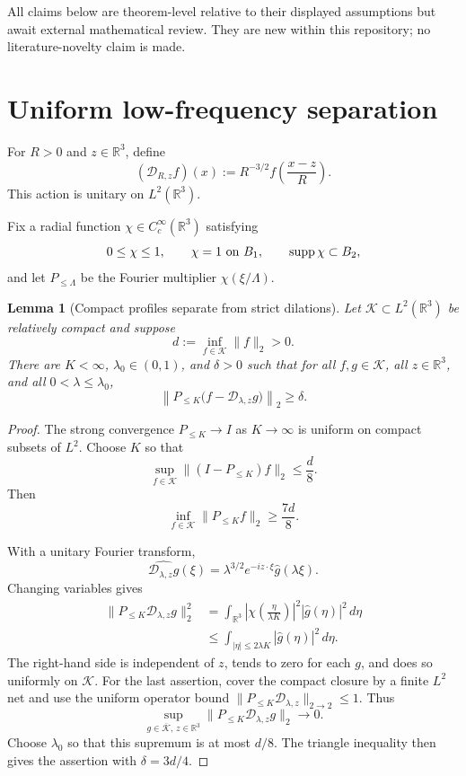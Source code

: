 \documentclass[11pt]{article}
\newtheorem{lemma}[theorem]{Lemma}
\theoremstyle{remark}
\newcommand{\R}{\mathbb R}
\newcommand{\D}{\mathcal D}
\newcommand{\Plo}[1]{P_{\le #1}}
\begin{document}
All claims below are theorem-level relative to their displayed assumptions
but await external mathematical review.  They are new within this
repository; no literature-novelty claim is made.

\section{Uniform low-frequency separation}

For \(R>0\) and \(z\in\R^3\), define
\[
 (\D_{R,z}f)(x)
 :=
 R^{-3/2}f\!\left(\frac{x-z}{R}\right).
\]
This action is unitary on \(L^2(\R^3)\).

Fix a radial function \(\chi\in C_c^\infty(\R^3)\) satisfying
\[
 0\le\chi\le1,\qquad
 \chi=1\ \hbox{on }B_1,\qquad
 \operatorname{supp}\chi\subset B_2,
\]
and let \(\Plo{\Lambda}\) be the Fourier multiplier
\(\chi(\xi/\Lambda)\).

\begin{lemma}[Compact profiles separate from strict dilations]
\label{lem:separation}
Let \(\mathcal K\subset L^2(\R^3)\) be relatively compact and suppose
\[
 d:=\inf_{f\in\mathcal K}\|f\|_2>0.
\]
There are \(K<\infty\), \(\lambda_0\in(0,1)\), and \(\delta>0\) such that
for all \(f,g\in\mathcal K\), all \(z\in\R^3\), and all
\(0<\lambda\le\lambda_0\),
\[
 \left\|
 \Plo K\bigl(f-\D_{\lambda,z}g\bigr)
 \right\|_2
 \ge\delta.
\]
\end{lemma}

\begin{proof}
The strong convergence \(\Plo K\to I\) as \(K\to\infty\) is uniform on
compact subsets of \(L^2\).  Choose \(K\) so that
\[
 \sup_{f\in\mathcal K}
 \|(I-\Plo K)f\|_2\le\frac d8.
\]
Then
\[
 \inf_{f\in\mathcal K}\|\Plo Kf\|_2\ge\frac{7d}{8}.
\]

With a unitary Fourier transform,
\[
 \widehat{\D_{\lambda,z}g}(\xi)
 =
 \lambda^{3/2}e^{-iz\cdot\xi}\widehat g(\lambda\xi).
\]
Changing variables gives
\[
\begin{aligned}
 \|\Plo K\D_{\lambda,z}g\|_2^2
 &=
 \int_{\R^3}
 \left|\chi\!\left(\frac{\eta}{\lambda K}\right)\right|^2
 |\widehat g(\eta)|^2\,d\eta\\
 &\le
 \int_{|\eta|\le2\lambda K}|\widehat g(\eta)|^2\,d\eta.
\end{aligned}
\]
The right-hand side is independent of \(z\), tends to zero for each \(g\),
and does so uniformly on \(\mathcal K\).  For the last assertion, cover the
compact closure by a finite \(L^2\) net and use the uniform operator bound
\(\|\Plo K\D_{\lambda,z}\|_{2\to2}\le1\).  Thus
\[
 \sup_{g\in\overline{\mathcal K},\,z\in\R^3}
 \|\Plo K\D_{\lambda,z}g\|_2
 \longrightarrow0.
\]
Choose \(\lambda_0\) so that this supremum is at most \(d/8\).  The triangle
inequality then gives the assertion with \(\delta=3d/4\).
\end{proof}
\end{document}
